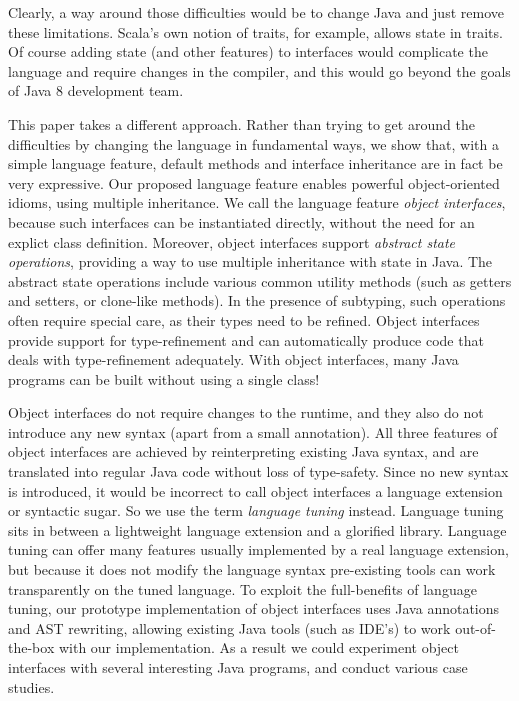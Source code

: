 \noindent Clearly, a way around those difficulties would be to
change Java and just remove these limitations. Scala's own
notion of traits, for example, allows state in traits. Of course adding
state (and other features) to interfaces would complicate the language
and require changes in the compiler, and this would go beyond the
goals of Java 8 development team.

This paper takes a different approach. Rather than trying to get
around the difficulties by changing the language in fundamental ways,
we show that, with a simple language feature, default methods and
interface inheritance are in fact be very expressive. Our proposed
language feature enables powerful object-oriented idioms, using
multiple inheritance. We call the language feature \emph{object
  interfaces}, because such interfaces can be instantiated directly,
without the need for an explict class definition. Moreover, object
interfaces support \emph{abstract state operations}, providing a way
to use multiple inheritance with state in Java. The abstract state
operations include various common utility methods (such as getters and
setters, or clone-like methods). In the presence of subtyping, such
operations often require special care, as their types need to be
refined. Object interfaces provide support for type-refinement and can
automatically produce code that deals with type-refinement
adequately. With object interfaces, many Java programs can be built
without using a single class!

Object interfaces do not require changes to the
runtime, and they also do not introduce any new syntax (apart from a
small annotation). All three features of object interfaces are
achieved by reinterpreting existing Java syntax, and are translated
into regular Java code without loss of type-safety. Since no new
syntax is introduced, it would be incorrect to call object interfaces
a language extension or syntactic sugar. So we use the term
\emph{language tuning} instead. Language tuning sits in between a
lightweight language extension and a glorified library. Language
tuning can offer many features usually implemented by a real language
extension, but because it does not modify the language syntax
pre-existing tools can work transparently on the tuned language.  To
exploit the full-benefits of language tuning, our prototype
implementation of object interfaces uses Java annotations and AST
rewriting, allowing existing Java tools (such as IDE's) to work
out-of-the-box with our implementation. As a result we could
experiment object interfaces with several interesting Java programs,
and conduct various case studies.

